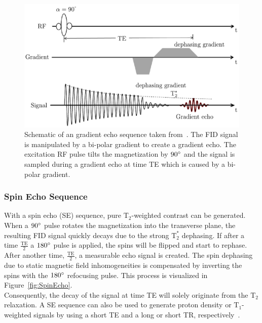 \begin{figure}[h] %
	\centering
	\includegraphics[width=\linewidth]{./Images/GradientEcho.pdf} 
	\caption{Schematic of an gradient echo sequence taken from~\cite{PulseSequences}. The FID signal is manipulated by a bi-polar gradient to create a gradient echo. The excitation RF pulse tilts the magnetization by $90 \degree$ and the signal is sampled during a gradient echo at time TE which is caused by a bi-polar gradient.}
	\label{fig:GradientEcho}
\end{figure}

\subsubsection{Spin Echo Sequence}
With a spin echo (SE) sequence, pure $\text{T}_2$-weighted contrast can be generated. When a $90\degree$ pulse rotates the magnetization into the transverse plane, the resulting FID signal quickly decays due to the strong $\text{T}^*_2$ dephasing. If after a time $\frac{\text{TE}}{2}$ a $180\degree$ pulse is applied, the spins will be flipped and start to rephase. After another time, $\frac{\text{TE}}{2}$, a measurable echo signal is created. The spin dephasing due to static magnetic field inhomogeneities is compensated by inverting the spins with the $180\degree$ refocusing pulse. This process is visualized in Figure~\ref{fig:SpinEcho}.\\
Consequently, the decay of the signal at time TE will solely originate from the $\text{T}_2$ relaxation. A SE sequence can also be used to generate proton density or $\text{T}_1$-weighted signals by using a short TE and a long or short TR, respectively~\cite{PulseSequences}.

